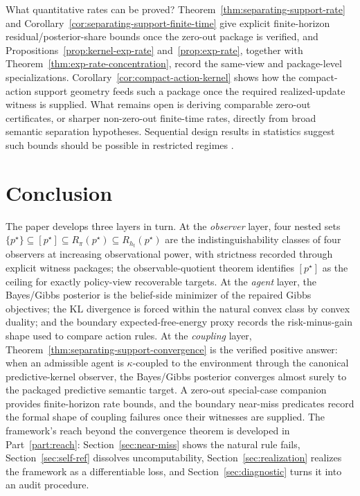 \documentclass[11pt]{article}
\theoremstyle{definition}
\theoremstyle{remark}
\theoremstyle{plain}
\theoremstyle{definition}
\begin{document}
What quantitative rates can be proved? Theorem~\ref{thm:separating-support-rate} and Corollary~\ref{cor:separating-support-finite-time} give explicit finite-horizon residual/posterior-share bounds once the zero-out package is verified, and Propositions~\ref{prop:kernel-exp-rate} and~\ref{prop:exp-rate}, together with Theorem~\ref{thm:exp-rate-concentration}, record the same-view and package-level specializations. Corollary~\ref{cor:compact-action-kernel} shows how the compact-action support geometry feeds such a package once the required realized-update witness is supplied. What remains open is deriving comparable zero-out certificates, or sharper non-zero-out finite-time rates, directly from broad semantic separation hypotheses. Sequential design results in statistics suggest such bounds should be possible in restricted regimes \citep{Chernoff1959,BoxHill1967}.

\section{Conclusion}
\label{sec:conclusion}

The paper develops three layers in turn. At the \emph{observer} layer, four nested sets $\{p^\star\}\subseteq[p^\star]\subseteq R_\pi(p^\star)\subseteq R_{h_t}(p^\star)$ are the indistinguishability classes of four observers at increasing observational power, with strictness recorded through explicit witness packages; the observable-quotient theorem identifies $[p^\star]$ as the ceiling for exactly policy-view recoverable targets. At the \emph{agent} layer, the Bayes/Gibbs posterior is the belief-side minimizer of the repaired Gibbs objectives; the KL divergence is forced within the natural convex class by convex duality; and the boundary expected-free-energy proxy records the risk-minus-gain shape used to compare action rules. At the \emph{coupling} layer, Theorem~\ref{thm:separating-support-convergence} is the verified positive answer: when an admissible agent is $\kappa$-coupled to the environment through the canonical predictive-kernel observer, the Bayes/Gibbs posterior converges almost surely to the packaged predictive semantic target. A zero-out special-case companion provides finite-horizon rate bounds, and the boundary near-miss predicates record the formal shape of coupling failures once their witnesses are supplied. The framework's reach beyond the convergence theorem is developed in Part~\ref{part:reach}: Section~\ref{sec:near-miss} shows the natural rule fails, Section~\ref{sec:self-ref} dissolves uncomputability, Section~\ref{sec:realization} realizes the framework as a differentiable loss, and Section~\ref{sec:diagnostic} turns it into an audit procedure.
\end{document}
